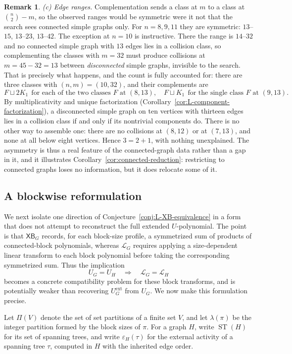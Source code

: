 \documentclass[11pt]{article}
\theoremstyle{plain}
\theoremstyle{definition}
\newtheorem{remark}[theorem]{Remark}
\renewcommand{\mathcal}{\mathscr}
\newcommand{\LL}{\mathcal{L}}    %
\newcommand{\XB}{\mathsf{XB}} %
\newcommand{\ST}{\operatorname{ST}} %
\newcommand{\eps}{\varepsilon}
\newcommand{\ext}{\mathrm{ext}}
\numberwithin{equation}{section}
\begin{document}
\begin{remark}
\emph{(c) Edge ranges.}  Complementation sends a class at $m$ to a class at
$\binom n2-m$, so the observed ranges would be symmetric were it not that the
search sees connected simple graphs only.
For $n=8,9,11$ they are symmetric: $13$--$15$, $13$--$23$, $13$--$42$.
The exception at $n=10$ is instructive. There the range is $14$--$32$ and
no connected simple graph with $13$ edges lies in a collision class, so complementing
the classes with $m=32$ must produce
collisions at $m=45-32=13$ between \emph{disconnected} simple graphs, invisible to the search.
That is precisely what happens, and the count is fully accounted for:
there are three classes with $(n,m)=(10,32)$, and their complements are
\[
   F\sqcup 2K_1 \ \ \text{for each of the two classes $F$ at }(8,13),
   \quad
   F\sqcup K_1 \ \ \text{for the single class $F$ at }(9,13).
\]
By multiplicativity and unique factorization
(Corollary~\ref{cor:L-component-factorization}), a disconnected simple graph
on ten vertices with thirteen edges lies in a collision class if and only if
its nontrivial components do.  There is no other way to assemble one: there
are no collisions at $(8,12)$ or at $(7,13)$, and none at all below eight
vertices.  Hence $3=2+1$, with nothing unexplained.  The asymmetry is thus a
real feature of the connected-graph data rather than a gap in it, and it
illustrates Corollary~\ref{cor:connected-reduction}: restricting to connected
graphs loses no information, but it does relocate some of it.
\end{remark}

\subsection{A blockwise reformulation}
\label{subsec:block-transform}
We next isolate one direction of Conjecture~\ref{conj:L-XB-equivalence} in a
form that does not attempt to reconstruct the full extended $U$-polynomial.
The point is that $\XB_G$ records, for each block-size profile, a symmetrized
sum of products of connected-block polynomials, whereas $\LL_G$ requires
applying a size-dependent linear transform to each block polynomial before
taking the corresponding symmetrized sum.  Thus the implication
\[
   U_G=U_H\quad\Longrightarrow\quad \LL_G=\LL_H
\]
becomes a concrete compatibility problem for these block transforms, and is potentially weaker
than recovering $U_G^{\ext}$ from $U_G$.  We now make this formulation precise.

Let $\Pi(V)$ denote the set of set partitions of a finite set $V$,
and let $\lambda(\pi)$ be the integer partition formed by the block sizes of $\pi$.
For a graph $H$, write $\ST(H)$ for its set of spanning trees, and write $\eps_H(\tau)$
for the external activity of a spanning tree $\tau$, computed in $H$ with the inherited edge order.
\end{document}
